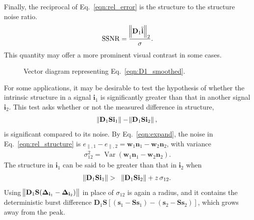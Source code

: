 \documentclass[twocolumn]{aastex631}
\newcommand{\Var}{\operatorname{Var}}
\begin{document}
Finally, the reciprocal of Eq.~\eqref{eqn:rel_error} is the structure to the structure noise ratio.
\begin{eqnarray}
\text{SSNR}=\frac{\norm{\mathbf{D}_1\tilde{\mathbf{i}}}_2}{\sigma}.
\label{eqn:SSNR}
\end{eqnarray}
This quantity may offer a more prominent visual contrast in some cases. 

\begin{figure}
    \centering
    \caption{Vector diagram representing Eq.~\eqref{eqn:D1_smoothed}.}
    \label{fig:vec_sum}
\end{figure}



For some applications, it may be desirable to test the hypothesis of whether the intrinsic structure in a signal ${\mathbf{i}_1}$ is significantly greater than that in another signal ${\mathbf{i}_2}$. This test asks whether or not the measured difference in structure,
%
\begin{eqnarray}
\norm{\mathbf{D}_1\mathbf{S} {\mathbf{i}_1}} - \norm{\mathbf{D}_1\mathbf{S} {\mathbf{i}_2}}, \label{eqn:rel_structure}
\end{eqnarray}
%
is significant compared to its noise. By Eq.~\eqref{eqn:expand}, the noise in Eq.~\eqref{eqn:rel_structure} is $e_{\parallel,1}-e_{\parallel,2}=\mathbf{w}_1\mathbf{n}_1-\mathbf{w}_2\mathbf{n}_2$, with variance
%
\begin{eqnarray}
\sigma_{12}^2=\Var(\mathbf{w}_1\mathbf{n}_1-\mathbf{w}_2\mathbf{n}_2). \label{eqn:rel_dmerror}
\end{eqnarray}
%
The structure in $\mathbf{i}_1$ can be said to be greater than that in $\mathbf{i}_2$ when 
%
\begin{eqnarray}
\norm{\mathbf{D}_1\mathbf{S} {\mathbf{i}_1}} & > & \norm{\mathbf{D}_1\mathbf{S} {\mathbf{i}_2}} + z\,\sigma_{12}. \label{eqn:add_error}
\end{eqnarray}
Using $\norm{\mathbf{D}_1\mathbf{S}( \mathbf{\Delta}_{\mathbf{i}_1} - \mathbf{\Delta}_{\mathbf{i}_2})}$ in place of $\sigma_{12}$ is again a radius, and it contains the deterministic burst difference $\mathbf{D}_1\mathbf{S}[(\mathbf{s}_1-\mathbf{S}\mathbf{s}_1)-(\mathbf{s}_2-\mathbf{S}\mathbf{s}_2)]$, which grows away from the peak.
\end{document}
